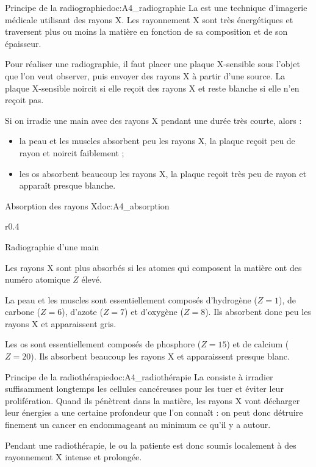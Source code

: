 \begin{doc}{Principe de la radiographie}{doc:A4_radiographie}
  La  est une technique d'imagerie médicale utilisant des rayons X.
  Les rayonnement X sont très énergétiques et traversent plus ou moins la matière en fonction de sa composition et de son épaisseur.

  Pour réaliser une radiographie, il faut placer une plaque X-sensible sous l'objet que l'on veut observer, puis envoyer des rayons X à partir d'une source.
  La plaque X-sensible noircit si elle reçoit des rayons X et reste blanche si elle n'en reçoit pas.

  Si on irradie une main avec des rayons X pendant une durée très courte, alors :
  \begin{itemize}
    \item la peau et les muscles absorbent peu les rayons X, la plaque reçoit peu de rayon et noircit faiblement ;
    \item les os absorbent beaucoup les rayons X, la plaque reçoit très peu de rayon et apparaît presque blanche.
  \end{itemize}
\end{doc}

\begin{doc}{Absorption des rayons X}{doc:A4_absorption}
  \begin{wrapfigure}{r}{0.4\linewidth}
    \vspace*{-34pt}

    \centering Radiographie d'une main    
  \end{wrapfigure}
  
  Les rayons X sont plus absorbés si les atomes qui composent la matière ont des numéro atomique $Z$ élevé.
  \begin{listePoints}
    \item La peau et les muscles sont essentiellement composés d'hydrogène ($Z = 1$), de carbone ($Z = 6$), d'azote ($Z = 7$) et d'oxygène  ($Z = 8$).
    Ils absorbent donc peu les rayons X et apparaissent gris.
    \item Les os sont essentiellement composés de phosphore ($Z = 15$) et de calcium ($Z = 20$).
    Ils absorbent beaucoup les rayons X et apparaissent presque blanc.
  \end{listePoints}
\end{doc}

\begin{doc}{Principe de la radiothérapie}{doc:A4_radiothérapie}
  La  consiste à irradier suffisamment longtemps les cellules cancéreuses pour les tuer et éviter leur prolifération.
  Quand ils pénètrent dans la matière, les rayons X vont décharger leur énergies a une certaine profondeur que l'on connaît : on peut donc détruire finement un cancer en endommageant au minimum ce qu'il y a autour.

  Pendant une radiothérapie, le ou la patiente est donc soumis localement à des rayonnement X intense et prolongée.
\end{doc}


